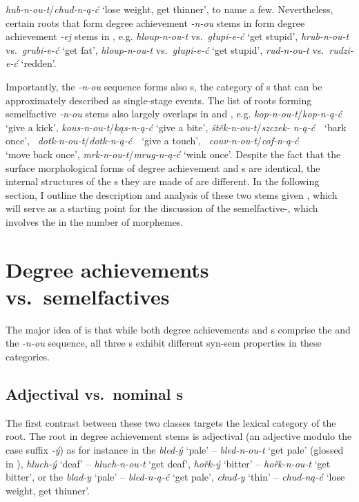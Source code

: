 \textit{hub-n-ou-t}/\textit{chud-n-\k{a}-\'c} `lose weight, get thinner', to name a few. Nevertheless, certain roots that form degree achievement \textit{-n-ou} stems in  form degree achievement \textit{-ej} stems in , e.g. \textit{hloup-n-ou-t} vs.\ \textit{g\l upi-e-\'c} `get stupid', \textit{hrub-n-ou-t} vs.\ \textit{grubi-e-\'c} `get fat', \textit{hloup-n-ou-t} vs.\ \textit{g\l upi-e-\'c} `get stupid', \textit{rud-n-ou-t} vs.\ \textit{rudzi-e-\'c} `redden'.
\par
Importantly, the \textit{-n-ou} sequence forms also  s, the category of s that can be approximately described as single-stage events. The list of roots forming semelfactive \textit{-n-ou} stems also largely overlaps in  and , e.g. \textit{kop-n-ou-t}/\textit{kop-n-\k{a}-\'c} `give a kick', \textit{kous-n-ou-t}/\textit{k\k{a}s-n-\k{a}-\'c} `give a bite', \textit{\v{s}t\v{e}k-n-ou-t}/\textit{szczek-}
\textit{n-\k{a}-\'c} \ \,`bark once', \ \textit{dotk-n-ou-t}/\textit{dotk-n-\k{a}-\'c} \ \,`give a touch', \ \textit{couv-n-ou-t}/\textit{cof-n-\k{a}-\'c}\\
 `move back once', \textit{mrk-n-ou-t}/\textit{mrug-n-\k{a}-\'c} `wink once'.
Despite the fact that the surface morphological forms of  degree achievement and  s are identical, the internal structures of the s they are made of are different.
In the following section, I outline the description and analysis of these two  stems given \cite{NU}, which will serve as a starting point for the discussion of the  semelfactive-, which involves the  in the number of morphemes.

\section{Degree achievements vs.\ semelfactives}\label{sec:DAS}

The major idea of \cite{NU} is that while both  degree achievements and  s comprise the  and the \textit{-n-ou} sequence, all three s exhibit different syn-sem properties in these categories. 

\subsection{Adjectival vs.\ nominal s}\label{sec:roots}

The first contrast between these two  classes targets the lexical category of the root. The root in degree achievement stems is  adjectival  (an adjective modulo the case suffix \textit{-\'y}) as for instance in the  \textit{bled-\'y} `pale' -- \textit{bled-n-ou-t} `get pale' (glossed in ), \textit{hluch-\'y} `deaf' -- \textit{hluch-n-ou-t} `get deaf',  \textit{ho\v{r}k-\'y} `bitter' -- \textit{ho\v{r}k-n-ou-t} `get bitter', or the  \textit{blad-y} `pale' -- \textit{bled-n-\k{a}-\'c} `get pale', \textit{chud-y} `thin' -- \textit{chud-n\k{a}-\'c} `lose weight, get thinner'. 

